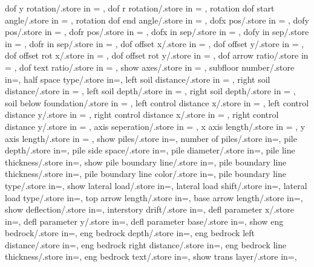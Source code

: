 {  dof y rotation/.store in = \dofyrotation,
  dof r rotation/.store in = \dofrrotation,
  rotation dof start angle/.store in = \rotdofstartangle,
  rotation dof end angle/.store in = \rotdofendangle,
  dofx pos/.store in = \dofposx,
  dofy pos/.store in = \dofposy,
  dofr pos/.store in = \dofposr,
  dofx in sep/.store in = \dofinnersepx,
  dofy in sep/.store in = \dofinnersepy,
  dofr in sep/.store in = \dofinnersepr,
  dof offset x/.store in = \dofoffsetx,
  dof offset y/.store in = \dofoffsety,
  dof offset rot x/.store in = \dofrotoffsetx,  
  dof offset rot y/.store in = \dofrotoffsety,
  dof arrow ratio/.store in = \dofarrowratio,
  dof text ratio/.store in = \doftextratio,
  show axes/.store in = \showaxes,
  subfloor number/.store in=\subfloors,
  half space type/.store in=\halfspacetype,
  left soil distance/.store in = \leftsoildist,
  right soil distance/.store in = \rightsoildist,
  left soil depth/.store in = \leftsoildepth,
  right soil depth/.store in = \rightsoildepth,
  soil below foundation/.store in = \soilbelowfound,
  left control distance x/.store in = \leftcontrolx,
  left control distance y/.store in = \leftcontroly,
  right control distance x/.store in = \rightcontrolx,
  right control distance y/.store in = \rightcontroly,
  axis seperation/.store in = \axisseperation,
  x axis length/.store in = \axeslenX,
  y axis length/.store in = \axeslenY,
  show piles/.store in=\showpiles,
  number of piles/.store in=\numberofpiles,
  pile depth/.store in=\piledepth,
  pile side space/.store in=\pilesidespace,
  pile diameter/.store in=\pilediameter,
  pile line thickness/.store in=\pilelinethickness,
  show pile boundary line/.store in=\showpbline,
  pile boundary line thickness/.store in=\pblinet,
  pile boundary line color/.store in=\pblinecolor,
  pile boundary line type/.store in=\pblinetype,
  show lateral load/.store in=\showlatload,
  lateral load shift/.store in=\latloadshift,
  lateral load type/.store in=\latloadtype,
  top arrow length/.store in=\toparrlen,
  base arrow length/.store in=\basearrlen,
  show deflection/.store in=\showdefl, 
  interstory drift/.store in=\drift,
  defl parameter x/.store in=,
  defl parameter y/.store in=,
  defl parameter base/.store in=,
  show eng bedrock/.store in=\showengbedrock,
  eng bedrock depth/.store in=\engbedrockdepth,
  eng bedrock left distance/.store in=\engbedrockleftdist,
  eng bedrock right distance/.store in=\engbedrockrightdist,
  eng bedrock line thickness/.store in=\engbedrocklinewidth,
  eng bedrock text/.store in=\engbedrocktext,
  show trans layer/.store in=\showtranslayer,
}
